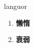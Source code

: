 
\begin{frame}
{\huge languor}
\begin{center}
\begin{enumerate}\Large
  \item \textbf{懒惰}
  \item \textbf{衰弱}
\end{enumerate}
\end{center}
\end{frame}
